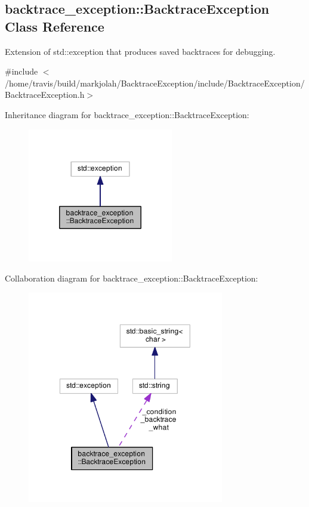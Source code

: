 \hypertarget{classbacktrace__exception_1_1BacktraceException}{\subsection{backtrace\-\_\-exception\-:\-:Backtrace\-Exception Class Reference}
\label{classbacktrace__exception_1_1BacktraceException}
}


Extension of std\-::exception that produces saved backtraces for debugging.  




{\ttfamily \#include $<$/home/travis/build/markjolah/\-Backtrace\-Exception/include/\-Backtrace\-Exception/\-Backtrace\-Exception.\-h$>$}



Inheritance diagram for backtrace\-\_\-exception\-:\-:Backtrace\-Exception\-:\nopagebreak
\begin{figure}[H]
\begin{center}
\leavevmode
\includegraphics[width=180pt]{classbacktrace__exception_1_1BacktraceException__inherit__graph}
\end{center}
\end{figure}


Collaboration diagram for backtrace\-\_\-exception\-:\-:Backtrace\-Exception\-:\nopagebreak
\begin{figure}[H]
\begin{center}
\leavevmode
\includegraphics[width=243pt]{classbacktrace__exception_1_1BacktraceException__coll__graph}
\end{center}
\end{figure}
